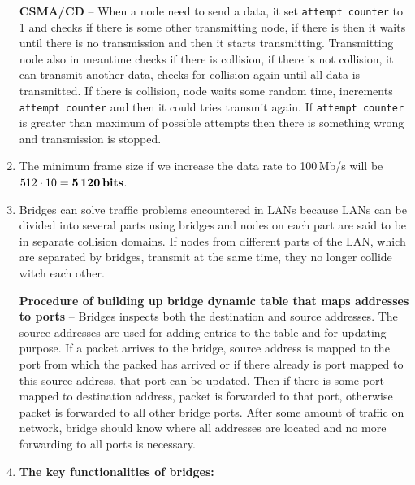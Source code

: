 \documentclass[a4paper, 11pt]{article}
\begin{document}
\begin{enumerate}
			\textbf{CSMA/CD} -- When a node need to send a data, it set \texttt{attempt counter} to 1 and checks
			if there is some other transmitting node, if there is then it waits until there is no transmission and then
			it starts transmitting. Transmitting node also in meantime checks if there is collision, if there is not
			collision, it can transmit another data, checks for collision again until all data is transmitted. If there
			is collision, node waits some random time, increments \texttt{attempt counter} and then it could tries
			transmit again. If \texttt{attempt counter} is greater than maximum of possible attempts then there is
			something wrong and transmission is stopped.

		\item %
			The minimum frame size if we increase the data rate to 100\,Mb/s will be
			$ 512 \cdot 10 = \boldsymbol{5\,120\,\text{\textbf{bits}}} $.

		\item %
			Bridges can solve traffic problems encountered in LANs because LANs can be divided into several parts
			using bridges and nodes on each part are said to be in separate collision domains. If nodes from different
			parts of the LAN, which are separated by bridges, transmit at the same time, they no longer collide witch
			each other.

			\textbf{Procedure of building up bridge dynamic table that maps addresses to ports} -- Bridges inspects
			both the destination and source addresses. The source addresses are used for adding entries to the table
			and for updating purpose. If a packet arrives to the bridge, source address is mapped to the port from
			which the packed has arrived or if there already is port mapped to this source address, that port can be
			updated. Then if there is some port mapped to destination address, packet is forwarded to that port,
			otherwise packet is forwarded to all other bridge ports. After some amount of traffic on network, bridge
			should know where all addresses are located and no more forwarding to all ports is necessary.

		\item %
			\textbf{The key functionalities of bridges:}
\end{enumerate}
\end{document}
